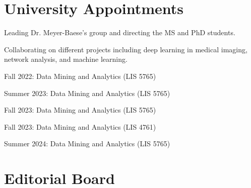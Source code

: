 \documentclass[]{template}
\begin{document}
\sectionsep
\section{University Appointments}

\sectionsep
{}

\vspace{\topsep} %
\begin{tightemize}
\item Leading Dr. Meyer-Baese's group and directing the MS and PhD students.
\item Collaborating on different projects including deep learning in medical imaging, network analysis, and machine learning.
\end{tightemize}

\sectionsep
{}

\vspace{\topsep} 
\begin{tightemize}
\item Fall 2022: Data Mining and Analytics (LIS 5765)
\item Summer 2023: Data Mining and Analytics (LIS 5765)
\item Fall 2023: Data Mining and Analytics (LIS 5765)
\item Fall 2023: Data Mining and Analytics (LIS 4761)
\item Summer 2024: Data Mining and Analytics (LIS 5765)
\end{tightemize}


\sectionsep
\section{Editorial Board}

\vspace{\topsep} %
\sectionsep
\end{document}
